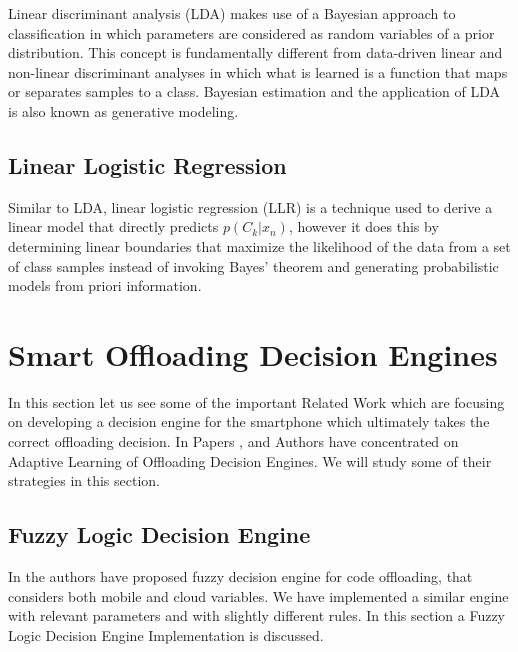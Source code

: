 \documentclass[12pt]{report}
\begin{document}
Linear discriminant analysis (LDA) makes use of a Bayesian approach to classification in which parameters are considered as random variables of a prior distribution. This concept is fundamentally different from data-driven linear and non-linear discriminant analyses in which what is learned is a function that maps or separates samples to a class. Bayesian estimation and the application of LDA is also known as generative modeling.

\section{Linear Logistic Regression}
Similar to LDA, linear logistic regression (LLR) is a technique used to derive a linear
model that directly predicts $p(C_k |x_n ) $, however it does this by determining linear
boundaries that maximize the likelihood of the data from a set of class samples instead of
invoking Bayes’ theorem and generating probabilistic models from priori information.


\chapter{Smart Offloading Decision Engines} %
\label{chap:SmartOffloadingDecisionEngines}

In this section let us see some of the important Related Work which are focusing on developing a decision engine for the smartphone which ultimately takes the correct offloading decision. In Papers \cite{flores2013adaptive}, \cite{khairy2013smartphone} and \cite{kemp2012cuckoo} Authors have concentrated on Adaptive Learning of Offloading Decision Engines. We will study some of their strategies in this section.
\section{Fuzzy Logic Decision Engine}

In \cite{flores2013adaptive} the authors have proposed fuzzy decision engine for code offloading, that considers both mobile and cloud variables. We have implemented a similar engine with relevant parameters and with slightly different rules. 
In this section a Fuzzy Logic Decision Engine Implementation is discussed.
\end{document}
